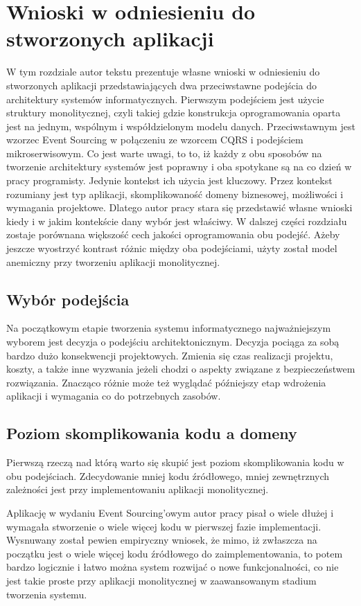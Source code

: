\chapter{Wnioski w odniesieniu do stworzonych aplikacji}
W tym rozdziale autor tekstu prezentuje własne wnioski w odniesieniu do stworzonych aplikacji przedstawiających dwa przeciwstawne podejścia do architektury systemów informatycznych. Pierwszym podejściem jest użycie struktury monolitycznej, czyli takiej gdzie konstrukcja oprogramowania oparta jest na jednym, wspólnym i współdzielonym modelu danych. Przeciwstawnym jest wzorzec Event Sourcing w połączeniu ze wzorcem CQRS i podejściem mikroserwisowym. Co jest warte uwagi, to to, iż każdy z obu sposobów na tworzenie architektury systemów jest poprawny i oba spotykane są na co dzień w pracy programisty. Jedynie kontekst ich użycia jest kluczowy. Przez kontekst rozumiany jest typ aplikacji, skomplikowaność domeny biznesowej, możliwości i wymagania projektowe. Dlatego autor pracy stara się przedstawić własne wnioski kiedy i w jakim kontekście dany wybór jest właściwy. W dalszej części rozdziału zostaje porównana większość cech jakości oprogramowania obu podejść. Ażeby jeszcze wyostrzyć kontrast różnic między oba podejściami, użyty został model anemiczny przy tworzeniu aplikacji monolitycznej.

\section{Wybór podejścia}
Na początkowym etapie tworzenia systemu informatycznego najważniejszym wyborem jest decyzja o podejściu architektonicznym. 
Decyzja pociąga za sobą bardzo dużo konsekwencji projektowych. Zmienia się czas realizacji projektu, koszty, a także inne wyzwania jeżeli chodzi o aspekty związane z bezpieczeństwem rozwiązania. Znacząco różnie może też wyglądać późniejszy etap wdrożenia aplikacji i wymagania co do potrzebnych zasobów. 
\section{Poziom skomplikowania kodu a domeny}
Pierwszą rzeczą nad którą warto się skupić jest poziom skomplikowania kodu w obu podejściach. Zdecydowanie mniej kodu źródłowego, mniej zewnętrznych zależności jest przy implementowaniu aplikacji monolitycznej.

Aplikację w wydaniu Event Sourcing'owym autor pracy pisał o wiele dłużej i wymagała stworzenie o wiele więcej kodu w pierwszej fazie implementacji. Wysnuwany został pewien empiryczny wniosek, że mimo, iż zwłaszcza na początku jest o wiele więcej kodu źródłowego do zaimplementowania, to potem bardzo logicznie i łatwo można system rozwijać o nowe funkcjonalności, co nie jest takie proste przy aplikacji monolitycznej w zaawansowanym stadium tworzenia systemu.

